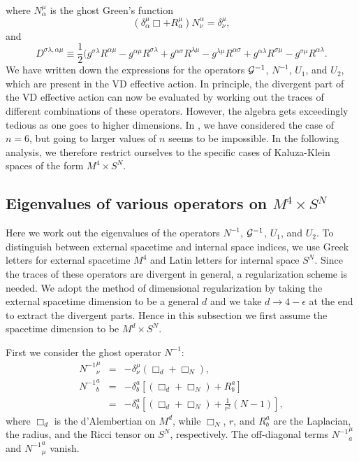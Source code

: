 \documentclass[a4paper,aps,preprint,groupedaddress,showpacs]{revtex4}
\begin{document}
where $N^{\mu}_{\alpha}$ is the ghost Green's function
\begin{equation}
(\delta^{\mu}_{\alpha}\Box+R^{\mu}_{\alpha})N^{\alpha}_{\nu}
=\delta^{\mu}_{\nu},
\end{equation}
and
\begin{equation}
D^{\sigma\lambda,\alpha\mu}\equiv
\frac{1}{2}(g^{\sigma\lambda}R^{\alpha\mu}-
g^{\alpha\mu}R^{\sigma\lambda}+
g^{\alpha\sigma}R^{\lambda\mu}-
g^{\lambda\mu}R^{\alpha\sigma}+
g^{\alpha\lambda}R^{\sigma\mu}-
g^{\sigma\mu}R^{\alpha\lambda}.
\end{equation}
We have written down the expressions for the operators 
${\cal G}^{-1}$, $N^{-1}$, $U_{1}$, and $U_{2}$,
which are present in the VD effective action. In principle,
the divergent part of the VD effective action can now be 
evaluated by working out the traces of different combinations
of these operators. However, the algebra gets exceedingly tedious
as one goes to higher dimensions. In \cite{CK1}, we have considered
the case of $n=6$, but going to larger values of $n$ seems to be
impossible. In the following analysis, we therefore  restrict
ourselves to the specific cases of Kaluza-Klein spaces of the 
form $M^{4}\times S^{N}$.

\subsection{Eigenvalues of various operators on 
	    $M^{4}\times S^{N}$}

Here we work out the eigenvalues of the operators $N^{-1}$,
${\cal G}^{-1}$, $U_{1}$, and $U_{2}$. To distinguish between
external spacetime and internal space indices, we  use Greek
letters for external spacetime $M^{4}$ and Latin letters for
internal space $S^{N}$. Since the traces of these operators are
divergent in general, a regularization scheme is needed. We 
adopt the method of dimensional regularization by taking the external
spacetime dimension to be a general $d$ and we  take
$d\rightarrow 4-\epsilon$ at the end to extract the divergent
parts. Hence in this subsection we  first assume the spacetime 
dimension to be $M^{d}\times S^{N}$.

First we consider the ghost operator $N^{-1}$: 
\begin{eqnarray}
{N^{-1}}^{\mu}_{\nu}&=&-\delta^{\mu}_{\nu}(\Box_{d}+\Box_{N}),
\\
{N^{-1}}^{a}_{b}&=&-\delta^{a}_{b}[(\Box_{d}+\Box_{N})+R^{a}_{b}]
\nonumber\\
&=&-\delta^{a}_{b}\left[
(\Box_{d}+\Box_{N})+\frac{1}{r^{2}}(N-1)\right],
\end{eqnarray}
where $\Box_{d}$ is the d'Alembertian on $M^{d}$, while 
$\Box_{N}$, $r$, and $R^{a}_{b}$ are the Laplacian, the radius, 
and the Ricci tensor on $S^{N}$, respectively. 
The off-diagonal terms 
${N^{-1}}^{\mu}_{a}$ and ${N^{-1}}^{a}_{\mu}$ vanish. 
\end{document}
